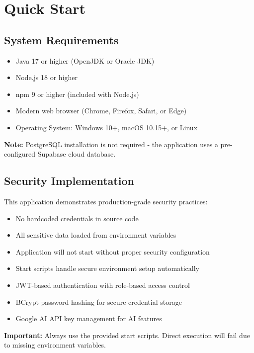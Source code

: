 \documentclass[11pt,a4paper]{article}
\begin{document}
\tableofcontents
\newpage

\section{Quick Start}

\subsection{System Requirements}

\begin{itemize}[leftmargin=*]
    \item Java 17 or higher (OpenJDK or Oracle JDK)
    \item Node.js 18 or higher
    \item npm 9 or higher (included with Node.js)
    \item Modern web browser (Chrome, Firefox, Safari, or Edge)
    \item Operating System: Windows 10+, macOS 10.15+, or Linux
\end{itemize}

\textbf{Note:} PostgreSQL installation is not required - the application uses a pre-configured Supabase cloud database.

\subsection{Security Implementation}

This application demonstrates production-grade security practices:

\begin{itemize}[leftmargin=*]
    \item No hardcoded credentials in source code
    \item All sensitive data loaded from environment variables
    \item Application will not start without proper security configuration
    \item Start scripts handle secure environment setup automatically
    \item JWT-based authentication with role-based access control
    \item BCrypt password hashing for secure credential storage
    \item Google AI API key management for AI features
\end{itemize}

\textbf{Important:} Always use the provided start scripts. Direct execution will fail due to missing environment variables.
\end{document}
